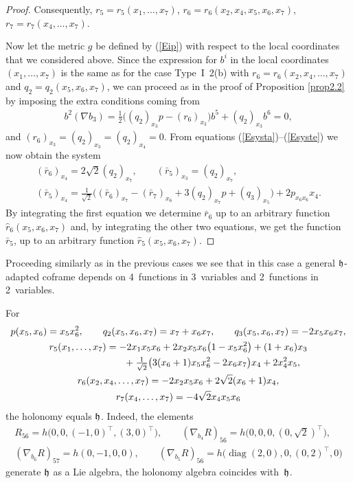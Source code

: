 \documentclass[pdftex]{sigma}
\numberwithin{equation}{section}
\newcommand\fh{{\frak h}}
\newcommand{\diag}{\operatorname{diag}}
\begin{document}
\begin{proof}
Consequently, $r_5=r_5(x_1,\dots,x_7)$, $r_6=r_6(x_2, x_4, x_5, x_6, x_7)$, $r_7=r_7(x_4,\dots,x_7)$.

Now let the metric $g$ be defined by (\ref{Eip}) with respect to the local coordinates that we considered above. Since the expression for $b^i$ in the local coordinates $(x_1, \ldots, x_7)$ is the same as for the case Type~I~2(b) with $r_6 = r_6 (x_2, x_4, \ldots, x_7)$ and $q_2 = q_2(x_5,x_6,x_7)$, we can proceed as in the proof of Proposition \ref{prop2.2} by imposing the extra conditions coming from \begin{gather*}b^2 (\nabla b_3) = \tfrac{1}{2} \big( (q_2)_{x_3} p - (r_6)_{x_3} \big) b^5 + (q_2)_{x_3} b^6 =0,\end{gather*} and $ (r_6)_{x_3} =(q_2)_{x_3} = (q_2)_{x_4} =0$. From equations (\ref{Esysta})--(\ref{Esyste}) we now obtain the system
\begin{gather*}
(\bar r_6)_{x_4}=2\sqrt 2(q_2)_{x_7}, \qquad
(\bar r_5)_{x_3} = (q_2)_{x_7}, \\
(\bar r_5)_{x_4}=\tfrac 1{\sqrt2}\big((\bar r_6)_{x_7} - (\bar r_7)_{x_6} +3 (q_2)_{x_7}p +(q_3)_{x_5}\big) +2p_{x_6 x_6} x_4.
\end{gather*}
By integrating the first equation we determine $\bar r_6$ up to an arbitrary function $\hat r_6(x_5, x_6,x_7)$ and, by integrating the other two equations, we get the function $\bar r_5$, up to an arbitrary function $\hat r_5(x_5, x_6,x_7)$.
 \end{proof}

\begin{Remark} Proceeding similarly as in the previous cases we see that in this case a general $\fh$-adapted coframe depends on 4~functions in 3~variables and 2~functions in 2~variables.
\end{Remark}
\begin{Example} For \begin{gather*}
p(x_5,x_6)= x_5 x_6^2, \qquad
q_2(x_5,x_6, x_7) = x_7+x_6 x_7,\qquad
q_3(x_5,x_6,x_7) = -2 x_5 x_6 x_7 ,\\
r_5(x_1,\dots, x_7) = -2x_1 x_5 x_6 +2 x_2 x_5 x_6 \big(1- x_5x_6^2\big) + (1 + x_6) x_3 \\
\hphantom{r_5(x_1,\dots, x_7) =}{} + \tfrac1{\sqrt2}\big(3 ( x_6 +1) x_5 x_6^2 - 2 x_6 x_7 \big) x_4 + 2 x_4^2 x_5,\\
r_6(x_2, x_4, \dots, x_7) = -2x_2 x_5 x_6 + 2 \sqrt{2}(x_6 + 1) x_4,\\
r_7(x_4,\dots, x_7) = -4\sqrt 2 x_4 x_5 x_6
\end{gather*}
the holonomy equals $\frak h$. Indeed, the elements
\begin{gather*}
R_{56}=h\big(0,0, (-1,0)^\top,(3,0)^\top\big),\qquad (\nabla_{b_4} R)_{56}= h\big(0,0,0,(0,\sqrt{2})^\top\big),\\
(\nabla_{b_6} R)_{57}= h(0,-1,0,0), \qquad (\nabla_{b_5} R)_{56}= h\big(\diag(2,0),0,(0,2)^\top,0\big)
\end{gather*}
 generate $\fh$ as a Lie algebra, the holonomy algebra coincides with~$\fh$.
\end{Example}
\end{document}
